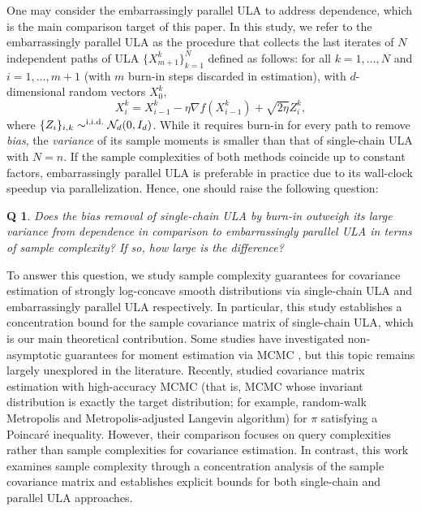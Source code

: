 \documentclass[12pt,reqno]{amsart}
\newtheorem*{question}{Q}
\theoremstyle{remark}
\theoremstyle{definition}
\newcommand{\calN}{\mathcal{N}}
\newcommand{\iid}{\textnormal{i.i.d.}}
\begin{document}
One may consider the embarrassingly parallel ULA to address dependence, which is the main comparison target of this paper.
In this study, we refer to the embarrassingly parallel ULA as the procedure that collects the last iterates of $N$ independent paths of ULA $\{X_{m+1}^{k}\}_{k=1}^{N}$ defined as follows: for all $k=1,\ldots,N$ and $i=1,\ldots,m+1$ (with $m$ burn-in steps discarded in estimation), with $d$-dimensional random vectors $X_{0}^{k}$,
\begin{equation}\label{eq:def:ep}
    X_{i}^{k}=X_{i-1}^{k}-\eta\nabla f(X_{i-1}^{k})+\sqrt{2\eta}Z_{i}^{k},
\end{equation}
where $\{Z_{i}\}_{i,k}\sim^{\iid}\calN_{d}(0,I_{d})$.
While it requires burn-in for every path to remove \emph{bias}, the \emph{variance} of its sample moments is smaller than that of single-chain ULA with $N=n$.
If the sample complexities of both methods coincide up to constant factors, embarrassingly parallel ULA is preferable in practice due to its wall-clock speedup via parallelization.
Hence, one should raise the following question:
\begin{question}
    Does the bias removal of single-chain ULA by burn-in outweigh its large variance from dependence in comparison to embarrassingly parallel ULA in terms of sample complexity? If so, how large is the difference?
\end{question}

To answer this question, we study sample complexity guarantees for covariance estimation of strongly log-concave smooth distributions via single-chain ULA and embarrassingly parallel ULA respectively.
In particular, this study establishes a concentration bound for the sample covariance matrix of single-chain ULA, which is our main theoretical contribution.
Some studies have investigated non-asymptotic guarantees for moment estimation via MCMC \citep{durmus2019high,kook2024covariance,shen2025high}, but this topic remains largely unexplored in the literature.
Recently, \citet{kook2024covariance} studied covariance matrix estimation with high-accuracy MCMC (that is, MCMC whose invariant distribution is exactly the target distribution; for example, random-walk Metropolis and Metropolis-adjusted Langevin algorithm) for $\pi$ satisfying a Poincar\'{e} inequality.
However, their comparison focuses on query complexities rather than sample complexities for covariance estimation.
In contrast, this work examines sample complexity through a concentration analysis of the sample covariance matrix and establishes explicit bounds for both single-chain and parallel ULA approaches.
\end{document}

